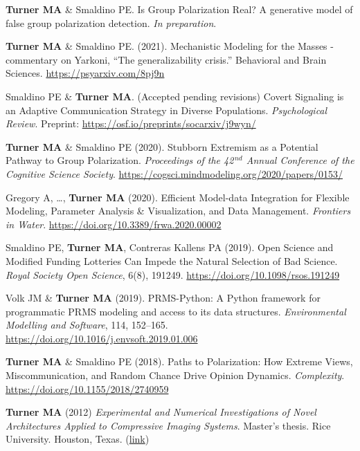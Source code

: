 \documentclass[letterpaper,11pt,oneside]{article}
\begin{document}
\begin{hangparas}{0.25in}{1}
  \textbf{Turner MA} \& Smaldino PE. Is Group Polarization Real? A generative model of false group polarization detection. 
  \emph{In preparation}.

  \textbf{Turner MA} \& Smaldino PE. (2021). Mechanistic Modeling for the Masses - 
  commentary on Yarkoni, ``The generalizability crisis.''
  Behavioral and Brain Sciences. \url{https://psyarxiv.com/8pj9n}

  Smaldino PE \& \textbf{Turner MA}. (Accepted pending revisions) Covert Signaling is an Adaptive Communication Strategy in Diverse Populations. \emph{Psychological Review}.
  Preprint: \url{https://osf.io/preprints/socarxiv/j9wyn/}

  \textbf{Turner MA} \& Smaldino PE (2020). Stubborn Extremism as a Potential Pathway to Group Polarization. \emph{Proceedings of the 42$^{\,nd}$ Annual Conference of the Cognitive Science Society}. \url{https://cogsci.mindmodeling.org/2020/papers/0153/}

    Gregory A, \ldots, \textbf{Turner MA} (2020). Efficient Model-data Integration for Flexible Modeling, Parameter Analysis \& Visualization, and Data Management. \emph{Frontiers in Water}. 
    \url{https://doi.org/10.3389/frwa.2020.00002}

    Smaldino PE, \textbf{Turner MA}, Contreras Kallens PA (2019). Open Science and Modified Funding Lotteries Can Impede the Natural Selection of Bad Science. \emph{Royal Society Open Science}, 6(8), 191249. \url{https://doi.org/10.1098/rsos.191249}

    Volk JM \& \textbf{Turner MA} (2019). PRMS-Python: A Python framework for programmatic PRMS modeling and access to its data structures. \emph{Environmental Modelling and Software}, 114, 152–165. \url{https://doi.org/10.1016/j.envsoft.2019.01.006}

    \textbf{Turner MA} \& Smaldino PE (2018). Paths to Polarization: How Extreme Views,
    Miscommunication, and Random Chance Drive Opinion Dynamics. \emph{Complexity}. \url{https://doi.org/10.1155/2018/2740959}
    
  \textbf{Turner MA} (2012) \emph{Experimental and Numerical Investigations of Novel Architectures Applied to Compressive Imaging Systems}. Master's thesis. Rice University. Houston, Texas. (\href{https://www.researchgate.net/publication/274720620_Experimental_and_Numerical_In vestigations_of_Novel_Architectures_Applied_to_Compressive_Imaging_Systems}{link})


\end{hangparas}
\end{document}
